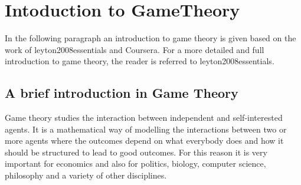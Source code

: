 \chapter{Intoduction to GameTheory}
\label{cha:1}
%



In the following paragraph an introduction to game theory is given based on the work of 
{leyton2008essentials} 
and 
{Coursera}. 
For a more detailed and full introduction to game theory, the reader is referred to 
{leyton2008essentials}. 
\section{A brief introduction in Game Theory}
\label{Cha:1:Intro.Game.Theory}




Game theory studies the interaction between independent and self-interested agents. It is a mathematical way of modelling the interactions between two or more agents where the outcomes depend on what everybody does and how it should be structured to lead to good outcomes. For this reason it is very important for economics and also for politics, biology, computer science, philosophy and a variety of other disciplines.  \\

